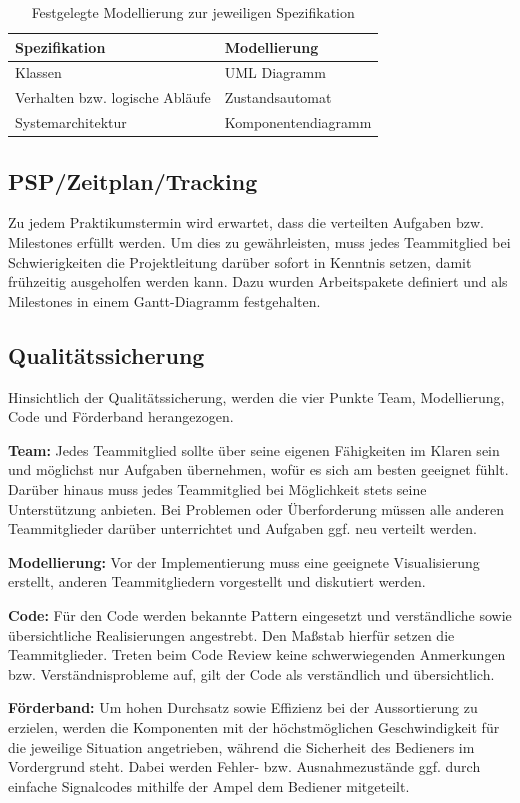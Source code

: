 \documentclass[a4paper, 11pt]{article}
\begin{document}
\begin{table}[h]
\centering
    \begin{tabularx}{\textwidth}{|l|X|}
    \hline
    \textbf{Spezifikation}&\textbf{Modellierung}\\
    \hline
    Klassen&UML Diagramm\\
    \hline
    Verhalten bzw. logische Abläufe&Zustandsautomat\\
    \hline
    Systemarchitektur&Komponentendiagramm\\
    \hline
    \end{tabularx}
\caption{Festgelegte Modellierung zur jeweiligen Spezifikation}
\label{visuals}
\end{table}

\subsection{PSP/Zeitplan/Tracking}
Zu jedem Praktikumstermin wird erwartet, dass die verteilten Aufgaben bzw. Milestones erfüllt werden. Um dies zu gewährleisten, muss jedes Teammitglied bei Schwierigkeiten die Projektleitung darüber sofort in Kenntnis setzen, damit frühzeitig ausgeholfen werden kann. Dazu wurden Arbeitspakete definiert und als Milestones in einem Gantt-Diagramm festgehalten.

\subsection{Qualitätssicherung}
Hinsichtlich der Qualitätssicherung, werden die vier Punkte Team, Modellierung, Code und Förderband herangezogen.
\medskip
\begin{compactenum}[1.]
    \item \textbf{Team:} Jedes Teammitglied sollte über seine eigenen Fähigkeiten im Klaren sein und möglichst nur Aufgaben übernehmen, wofür es sich am besten geeignet fühlt. Darüber hinaus muss jedes Teammitglied bei Möglichkeit stets seine Unterstützung anbieten. Bei Problemen oder Überforderung müssen alle anderen Teammitglieder darüber unterrichtet und Aufgaben ggf. neu verteilt werden.
\medskip
    \item \textbf{Modellierung:} Vor der Implementierung muss eine geeignete Visualisierung erstellt, anderen Teammitgliedern vorgestellt und diskutiert werden. 
\medskip
    \item \textbf{Code:} Für den Code werden bekannte Pattern eingesetzt und verständliche sowie übersichtliche Realisierungen angestrebt. Den Maßstab hierfür setzen die Teammitglieder. Treten beim Code Review keine schwerwiegenden Anmerkungen bzw. Verständnisprobleme auf, gilt der Code als verständlich und übersichtlich.
\medskip
    \item \textbf{Förderband:} Um hohen Durchsatz sowie Effizienz bei der Aussortierung zu erzielen, werden die Komponenten mit der höchstmöglichen Geschwindigkeit für die jeweilige Situation angetrieben, während die Sicherheit des Bedieners im Vordergrund steht. Dabei werden Fehler- bzw. Ausnahmezustände ggf. durch einfache Signalcodes mithilfe der Ampel dem Bediener mitgeteilt.
\end{compactenum}
\end{document}

